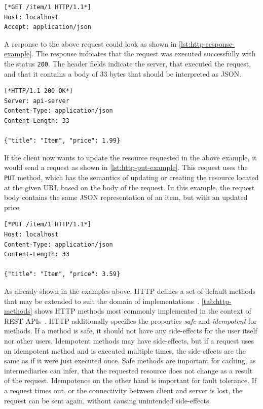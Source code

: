 \begin{lstlisting}[caption={\acs{HTTP} GET Request}, showlines=true, label=lst:http-get-example, language=http]
[*GET /item/1 HTTP/1.1*]
Host: localhost
Accept: application/json

\end{lstlisting}

A response to the above request could look as shown in \autoref{lst:http-response-example}.
The response indicates that the request was executed successfully with the status \texttt{200}.
The header fields indicate the server, that executed the request, and that it contains a body of 33 bytes that should be interpreted as \ac{JSON}.

\begin{lstlisting}[caption={\acs{HTTP} Response to GET Request}, label=lst:http-response-example, language=http]
[*HTTP/1.1 200 OK*]
Server: api-server
Content-Type: application/json
Content-Length: 33

{"title": "Item", "price": 1.99}
\end{lstlisting}

If the client now wants to update the resource requested in the above example, it would send a request as shown in \autoref{lst:http-put-example}.
This request uses the \texttt{PUT} method, which has the semantics of updating or creating the resource located at the given \ac{URL} based on the body of the request.
In this example, the request body contains the same \ac{JSON} representation of an item, but with an updated price.

\begin{lstlisting}[caption={\acs{HTTP} PUT Request}, label=lst:http-put-example, language=http]
[*PUT /item/1 HTTP/1.1*]
Host: localhost
Content-Type: application/json
Content-Length: 33

{"title": "Item", "price": 3.59}
\end{lstlisting}

As already shown in the examples above, \ac{HTTP} defines a set of default methods that may be extended to suit the domain of implementations~\cite{RFC2068}.
\autoref{tab:http-methods} shows \ac{HTTP} methods most commonly implemented in the context of \ac{REST} \acp{API}~\cite{Buelthoff2019}.
\ac{HTTP} additionally specifies the properties \textit{safe} and \textit{idempotent} for methods.
If a method is safe, it should not have any side-effects for the user itself nor other users.
Idempotent methods may have side-effects, but if a request uses an idempotent method and is executed multiple times, the side-effects are the same as if it were just executed once.
Safe methods are important for caching, as intermediaries can infer, that the requested resource does not change as a result of the request.
Idempotence on the other hand is important for fault tolerance.
If a request times out, or the connectivity between client and server is lost, the request can be sent again, without causing unintended side-effects.

